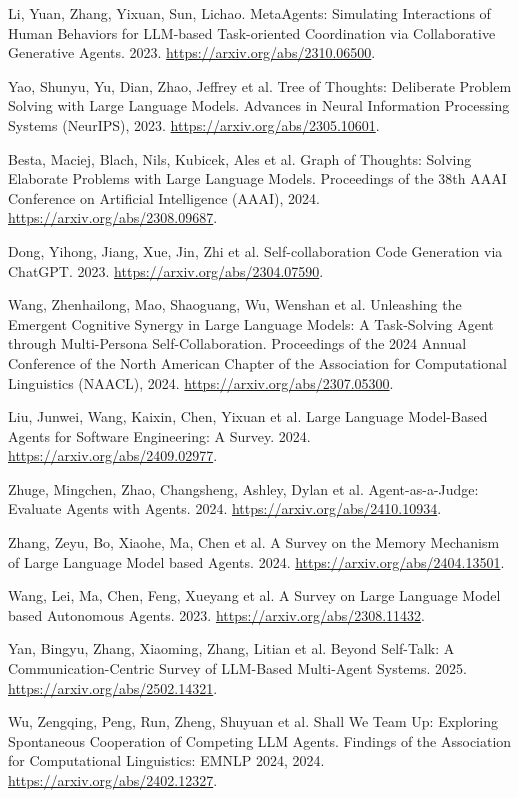  Li, Yuan, Zhang, Yixuan, Sun, Lichao. {MetaAgents}: Simulating Interactions of Human Behaviors for {LLM}-based Task-oriented Coordination via Collaborative Generative Agents. 2023. \url{https://arxiv.org/abs/2310.06500}.

 Yao, Shunyu, Yu, Dian, Zhao, Jeffrey et al. Tree of Thoughts: Deliberate Problem Solving with Large Language Models. Advances in Neural Information Processing Systems (NeurIPS), 2023. \url{https://arxiv.org/abs/2305.10601}.

 Besta, Maciej, Blach, Nils, Kubicek, Ales et al. Graph of Thoughts: Solving Elaborate Problems with Large Language Models. Proceedings of the 38th AAAI Conference on Artificial Intelligence (AAAI), 2024. \url{https://arxiv.org/abs/2308.09687}.

 Dong, Yihong, Jiang, Xue, Jin, Zhi et al. Self-collaboration Code Generation via {ChatGPT}. 2023. \url{https://arxiv.org/abs/2304.07590}.

 Wang, Zhenhailong, Mao, Shaoguang, Wu, Wenshan et al. Unleashing the Emergent Cognitive Synergy in Large Language Models: A Task-Solving Agent through Multi-Persona Self-Collaboration. Proceedings of the 2024 Annual Conference of the North American Chapter of the Association for Computational Linguistics (NAACL), 2024. \url{https://arxiv.org/abs/2307.05300}.

 Liu, Junwei, Wang, Kaixin, Chen, Yixuan et al. Large Language Model-Based Agents for Software Engineering: A Survey. 2024. \url{https://arxiv.org/abs/2409.02977}.

 Zhuge, Mingchen, Zhao, Changsheng, Ashley, Dylan et al. Agent-as-a-Judge: Evaluate Agents with Agents. 2024. \url{https://arxiv.org/abs/2410.10934}.

 Zhang, Zeyu, Bo, Xiaohe, Ma, Chen et al. A Survey on the Memory Mechanism of Large Language Model based Agents. 2024. \url{https://arxiv.org/abs/2404.13501}.

 Wang, Lei, Ma, Chen, Feng, Xueyang et al. A Survey on Large Language Model based Autonomous Agents. 2023. \url{https://arxiv.org/abs/2308.11432}.

 Yan, Bingyu, Zhang, Xiaoming, Zhang, Litian et al. Beyond Self-Talk: A Communication-Centric Survey of {LLM}-Based Multi-Agent Systems. 2025. \url{https://arxiv.org/abs/2502.14321}.

 Wu, Zengqing, Peng, Run, Zheng, Shuyuan et al. Shall We Team Up: Exploring Spontaneous Cooperation of Competing {LLM} Agents. Findings of the Association for Computational Linguistics: EMNLP 2024, 2024. \url{https://arxiv.org/abs/2402.12327}.

